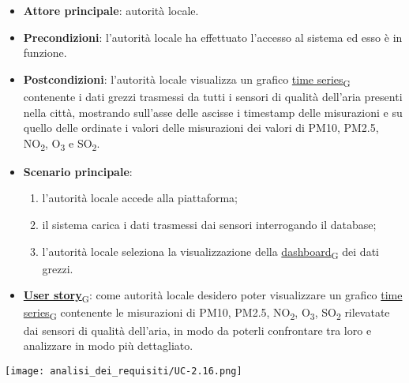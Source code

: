 \newpage
{}
\begin{itemize}
	\item \textbf{Attore principale}: autorità locale.
	\item \textbf{Precondizioni}: l'autorità locale ha effettuato l'accesso al sistema ed esso è in funzione.
	\item \textbf{Postcondizioni}: l'autorità locale visualizza un grafico \href{https://7last.github.io/docs/pb/documentazione-interna/glossario\#time-series}{time series\textsubscript{G}} contenente i dati grezzi trasmessi da tutti i sensori di qualità dell'aria presenti nella città, mostrando sull'asse delle ascisse i timestamp delle misurazioni e su quello delle ordinate i valori delle misurazioni dei valori di PM10, PM2.5, NO\textsubscript{2}, O\textsubscript{3} e SO\textsubscript{2}. 
	\item \textbf{Scenario principale}:
	      \begin{enumerate}
		      \item l'autorità locale accede alla piattaforma;
		      \item il sistema carica i dati trasmessi dai sensori interrogando il database;
		      \item l'autorità locale seleziona la visualizzazione della \href{https://7last.github.io/docs/pb/documentazione-interna/glossario\#dashboard}{dashboard\textsubscript{G}} dei dati grezzi.
	      \end{enumerate}
	\item \href{https://7last.github.io/docs/pb/documentazione-interna/glossario\#user-story}{\textbf{User story}\textsubscript{G}}:
	      come autorità locale desidero poter visualizzare un grafico \href{https://7last.github.io/docs/pb/documentazione-interna/glossario\#time-series}{time series\textsubscript{G}} contenente le misurazioni di PM10, PM2.5, NO\textsubscript{2}, O\textsubscript{3}, SO\textsubscript{2} rilevatate dai sensori di qualità dell'aria, in modo da poterli confrontare tra loro e analizzare in modo più dettagliato.
\end{itemize}
\begin{center}
	\texttt{[image: analisi\_dei\_requisiti/UC-2.16.png]}
\end{center}

